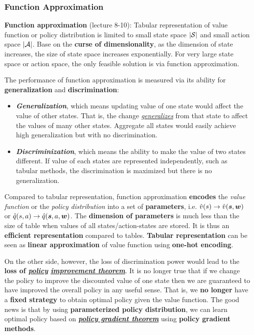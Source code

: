 \documentclass[11pt]{article}
\begin{document}
\subsubsection{Function Approximation}

\textbf{Function approximation} (lecture 8-10): Tabular representation of value function or policy distribution is limited to small state space $|{\mathcal S}|$ and small action space $|{\mathcal A}|$. Base on the \textbf{curse of dimensionality}, as the dimension of state increases, the size of state space increases exponentially. For very large state space or action space, the only feasible solution is via function approximation. 

The performance of function approximation is measured via its ability for \textbf{generalization} and \textbf{discrimination}:
\begin{itemize}
\item  \textbf{\emph{Generalization}}, which means updating value of one state would affect the value of other states. That is, the change \emph{\underline{generalizes}} from that state to affect the values of many other states. Aggregate all states would easily achieve high generalization but with no discrimination. 

\item \textbf{\emph{Discriminization}}, which means the ability to make the value of two states different. If value of each states are represented independently, such as tabular methods, the discrimination is maximized but there is no generalization. 
\end{itemize}

Compared to tabular representation, function approximation \textbf{encodes} the \emph{value function} or the \emph{policy distribution} into a set of \textbf{parameters}, i.e.  $\hat{v}(s) \rightarrow \hat{v}(\boldsymbol{s}, \boldsymbol{w})$ or $\hat{q}(s, a) \rightarrow \hat{q}(\boldsymbol{s}, a, \boldsymbol{w})$. The \textbf{dimension of parameters} is much less than the size of table when values of all states/action-states are stored. It is thus an \textbf{efficient representation} compared to tables. \textbf{Tabular representation} can be seen as \textbf{linear approximation} of value function using \textbf{one-hot encoding}. 

On the other side, however, the loss of discrimination power would lead to the \textbf{loss of \underline{\emph{policy}} \underline{\emph{improvement theorem}}}. It is no longer true that if we change the policy to improve the discounted value of one state then we are guaranteed to have improved the overall policy in any useful sense. That is, we \textbf{no longer} have a \textbf{fixed strategy} to obtain optimal policy given the value function. The good news is that by using \textbf{parameterized policy distribution}, we can learn optimal policy based on \underline{\emph{\textbf{policy gradient theorem}}} using \textbf{policy gradient methods}.
\end{document}

